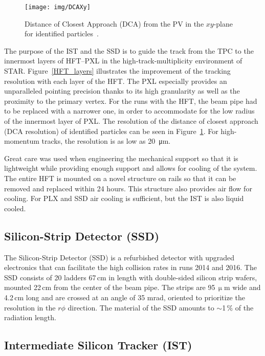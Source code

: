 \begin{figure}[!htb]
\begin{center}
 \texttt{[image: img/DCAXy]}\\
\end{center}
\caption{\label{DCA}Distance of Closest Approach (DCA) from the PV in the $xy$-plane for identified particles~\cite{D0v2paper}.}
\end{figure}

The purpose of the IST and the SSD is to guide the track from the TPC to the innermost layers of HFT--PXL in the high-track-multiplicity environment of STAR. Figure~\ref{HFT_layers} illustrates the improvement of the tracking resolution with each layer of the HFT\@. The PXL especially provides an unparalleled pointing precision thanks to its high granularity as well as the proximity to the primary vertex. For the runs with the HFT, the beam pipe had to be replaced with a narrower one, in order to accommodate for the low radius of the innermost layer of PXL\@. The resolution of the distance of closest approach (DCA resolution) of identified particles can be seen in Figure~\ref{DCA}. For high-momentum tracks, the resolution is as low as \SI{20}{\micro\metre}.


Great care was used when engineering the mechanical support so that it is lightweight while providing enough support and allows for cooling of the system. The entire HFT is mounted on a novel structure on rails so that it can be removed and replaced within 24 hours. This structure also provides air flow for cooling. For PLX and SSD  air cooling is sufficient, but the IST is also liquid cooled.

\subsection{Silicon-Strip Detector (SSD)}

The Silicon-Strip Detector (SSD) is a refurbished detector with upgraded electronics that can facilitate the high collision rates in runs 2014 and 2016\@. The SSD consists of 20 ladders 67$\,$cm in length with double-sided silicon strip wafers, mounted 22$\,$cm from the center of the beam pipe. The strips are 95$\,\upmu$m wide and 4.2$\,$cm long and are crossed at an angle of 35 mrad, oriented to prioritize the resolution in the $r\phi$ direction. The material of the SSD amounts to $\sim$1$\,\%$ of the radiation length.

\subsection{Intermediate Silicon Tracker (IST)}

